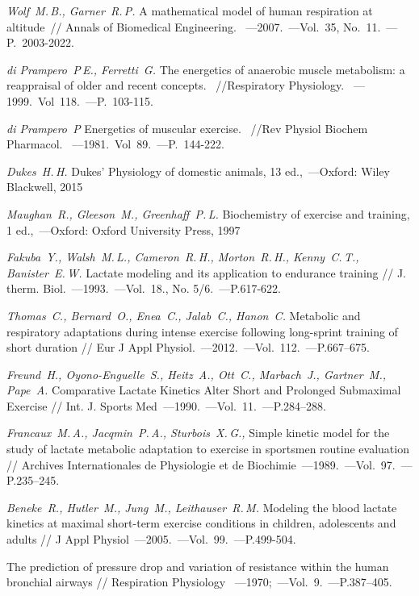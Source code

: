 \begin{thebibliography}{}
	 {\it Wolf~M.\,B., Garner~R.\,P.} A mathematical model of human respiration at altitude~// Annals of Biomedical Engineering. ~---2007.~---Vol.~35, No.~11.~--- P.~2003-2022.
	
	 {\it di Prampero~P\,E., Ferretti~G.} The energetics of anaerobic muscle metabolism: a reappraisal of older and recent concepts. ~//Respiratory Physiology. ~---1999.~Vol~118.~---P.~103-115. 
	
     {\it di Prampero~P} Energetics of muscular exercise. ~//Rev Physiol Biochem Pharmacol. ~---1981.~Vol~89.~---P.~144-222. 
    
     {\it Dukes~H.\,H.} Dukes' Physiology of domestic animals, 13 ed.,~---Oxford: Wiley Blackwell, 2015
    
     {\it Maughan~R., Gleeson~M., Greenhaff~P.\,L.} Biochemistry of exercise and training, 1 ed.,~---Oxford: Oxford University Press, 1997
    
     {\it Fakuba~Y., Walsh~M.\,L., Cameron~R.\,H., Morton~R.\,H., Kenny~C.\,T., Banister~E.\,W.} Lactate modeling and its application to endurance training // J. therm. Biol.~---1993.~---Vol.~18., No. 5/6.~---P.617-622.
    
     {\it Thomas~C., Bernard~O., Enea~C., Jalab~C., Hanon~C.} Metabolic and respiratory adaptations during intense exercise following long-sprint training of short duration // Eur J Appl Physiol.~---2012.~---Vol.~112.~---P.667–675.
    
     {\it Freund~H., Oyono-Enguelle~S., Heitz~A., Ott~C., Marbach~J., Gartner~M., Pape~A. } Comparative Lactate Kinetics Alter Short and
Prolonged Submaximal Exercise // Int. J. Sports Med~---1990.~---Vol.~11.~---P.284–288.

     {\it Francaux~M.\,A.,  Jacqmin~P.\,A., Sturbois~X.\,G., } Simple kinetic model for the study of lactate metabolic adaptation to exercise in sportsmen routine evaluation // Archives Internationales de Physiologie et de Biochimie~---1989.~---Vol.~97.~---P.235–245.
    
     {\it Beneke~R., Hutler~M., Jung~M., Leithauser~R.\,M.} Modeling the blood lactate kinetics at maximal short-term exercise conditions in children, adolescents and adults // J Appl Physiol~---2005.~---Vol.~99.~---P.499-504.
    
     The prediction of pressure drop and variation of resistance within the human bronchial airways // Respiration Physiology ~---1970;~---Vol.~9.~---P.387–405.
    

\end{thebibliography}
